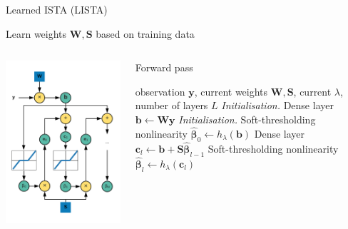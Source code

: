\documentclass[9pt]{beamer}
\begin{document}
\begin{frame}{Learned ISTA (LISTA)}
\begin{block}{}
Learn weights $\mathbf{W}, \mathbf{S}$ based on training data
\end{block}
 \begin{columns}
    \begin{column}{0.4\textwidth}
          \includegraphics[width=0.75\columnwidth]{graphics/LISTA_main.pdf}
    \end{column}
    \begin{column}{0.6\textwidth}
    \begin{block}{Forward pass}
    \begin{algorithmic}[1]
      \REQUIRE observation $\mathbf{y}$, {\color{red}current weights $\mathbf{W}, \mathbf{S}$, current $\lambda$, number of layers $L$}
      \STATE \textit{Initialisation.} Dense layer $\mathbf{b} \gets \mathbf{W}\mathbf{y}$
      \STATE \textit{Initialisation.} Soft-thresholding nonlinearity $\widehat{\boldsymbol\beta}_0 \gets h_\lambda(\mathbf{b})$
      \STATE Dense layer $\mathbf{c}_l \gets \mathbf{b} + \mathbf{S}\widehat{\boldsymbol\beta}_{l-1}$
      \STATE Soft-thresholding nonlinearity $\widehat{\boldsymbol\beta}_{l} \gets h_\lambda(\mathbf{c}_l)$

\end{algorithmic}
\end{block}
\end{column}
\end{columns}
\end{frame}
\end{document}
